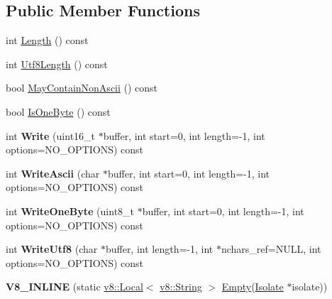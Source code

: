 \subsection*{Public Member Functions}
\begin{DoxyCompactItemize}
\item 
int \hyperlink{classv8_1_1_string_a94353cd764d2bf0cda141714c3c9eb6c}{Length} () const 
\item 
int \hyperlink{classv8_1_1_string_afb2bb302d3ffe807e66a0797d6ac4189}{Utf8\+Length} () const 
\item 
bool \hyperlink{classv8_1_1_string_a19f5c670a9b683afc2804d5f2eda52dc}{May\+Contain\+Non\+Ascii} () const 
\item 
bool \hyperlink{classv8_1_1_string_a2e6771bd8fbd0e2d1fa01811d3e8c7dc}{Is\+One\+Byte} () const 
\item 
\hypertarget{classv8_1_1_string_ab1ee96f8adf969958faeff9eced9a56f}{}int {\bfseries Write} (uint16\+\_\+t $\ast$buffer, int start=0, int length=-\/1, int options=N\+O\+\_\+\+O\+P\+T\+I\+O\+N\+S) const \label{classv8_1_1_string_ab1ee96f8adf969958faeff9eced9a56f}

\item 
\hypertarget{classv8_1_1_string_aeba31f9181144c3867c04b140aad86c0}{}int {\bfseries Write\+Ascii} (char $\ast$buffer, int start=0, int length=-\/1, int options=N\+O\+\_\+\+O\+P\+T\+I\+O\+N\+S) const \label{classv8_1_1_string_aeba31f9181144c3867c04b140aad86c0}

\item 
\hypertarget{classv8_1_1_string_a61114324ef659345f04b2730679eb456}{}int {\bfseries Write\+One\+Byte} (uint8\+\_\+t $\ast$buffer, int start=0, int length=-\/1, int options=N\+O\+\_\+\+O\+P\+T\+I\+O\+N\+S) const \label{classv8_1_1_string_a61114324ef659345f04b2730679eb456}

\item 
\hypertarget{classv8_1_1_string_ad62145c723fa0ce55095223223263f41}{}int {\bfseries Write\+Utf8} (char $\ast$buffer, int length=-\/1, int $\ast$nchars\+\_\+ref=N\+U\+L\+L, int options=N\+O\+\_\+\+O\+P\+T\+I\+O\+N\+S) const \label{classv8_1_1_string_ad62145c723fa0ce55095223223263f41}

\item 
\hypertarget{classv8_1_1_string_afd7a2ae2b9625ae0f0cee18a4dd566f4}{}{\bfseries V8\+\_\+\+I\+N\+L\+I\+N\+E} (static \hyperlink{classv8_1_1_local}{v8\+::\+Local}$<$ \hyperlink{classv8_1_1_string}{v8\+::\+String} $>$ \hyperlink{classv8_1_1_string_a5f222b35243cdfc0bb2c12a300d62d11}{Empty}(\hyperlink{classv8_1_1_isolate}{Isolate} $\ast$isolate))\label{classv8_1_1_string_afd7a2ae2b9625ae0f0cee18a4dd566f4}


\end{DoxyCompactItemize}
